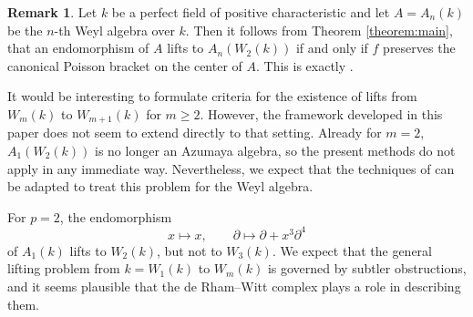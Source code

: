 \documentclass[a4paper,11pt,reqno]{amsart}%
\theoremstyle{definition}
\newtheorem{remark}[theorem]{Remark}
\newcommand{\<}{\<}
\renewcommand{\>}{\>}
\numberwithin{equation}{subsection}
\begin{document}
\begin{remark}
Let $k$ be a perfect field of positive characteristic and let $A = A_n(k)$ be the $n$-th Weyl algebra over $k$. Then it follows from 
Theorem \ref{theorem:main}, that an endomorphism of $A$ lifts to $A_n(W_2(k))$ if and only if $f$ preserves the canonical Poisson bracket 
on the center of $A$. This is exactly \cite[Theorem 2.7]{LTL}.
\medskip



It would be interesting to formulate criteria for the existence of lifts from $W_m(k)$ to $W_{m+1}(k)$ for $m \geq 2$. However, the framework developed in this paper does not seem to extend directly to that setting. Already for $m=2$, \(A_1(W_2(k))\) is no longer an Azumaya algebra, so the present methods do not apply in any immediate way. Nevertheless, we expect that the techniques of \cite{LTL} can be adapted to treat this problem for the Weyl algebra.

For \(p=2\), the endomorphism
\[
x \mapsto x, \qquad \partial \mapsto \partial + x^3 \partial^4
\]
of \(A_1(k)\) lifts to \(W_2(k)\), but not to \(W_3(k)\). We expect that the general lifting problem from \(k = W_1(k)\) to \(W_m(k)\) is governed by subtler obstructions, and it seems plausible that the de Rham--Witt complex plays a role in describing them.

\end{remark}

\begin{bibdiv}
\begin{biblist}












\end{biblist}
\end{bibdiv}
\end{document}
